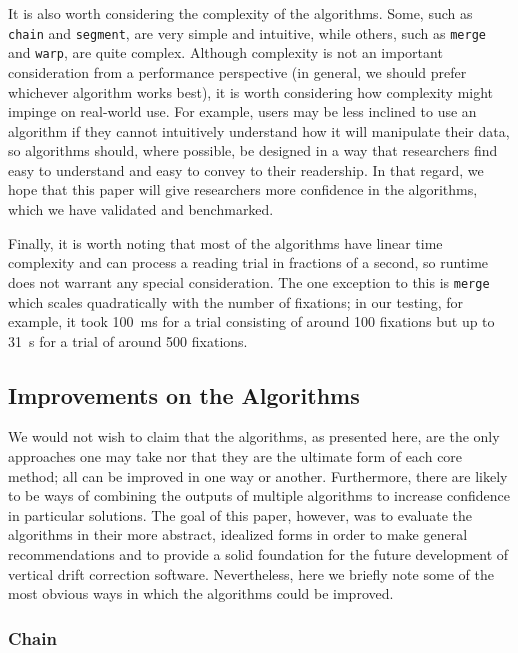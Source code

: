 \documentclass[doc,biblatex]{apa7}
\begin{document}
It is also worth considering the complexity of the algorithms. Some, such as \texttt{chain} and \texttt{segment}, are very simple and intuitive, while others, such as \texttt{merge} and \texttt{warp}, are quite complex. Although complexity is not an important consideration from a performance perspective (in general, we should prefer whichever algorithm works best), it is worth considering how complexity might impinge on real-world use. For example, users may be less inclined to use an algorithm if they cannot intuitively understand how it will manipulate their data, so algorithms should, where possible, be designed in a way that researchers find easy to understand and easy to convey to their readership. In that regard, we hope that this paper will give researchers more confidence in the algorithms, which we have validated and benchmarked.

Finally, it is worth noting that most of the algorithms have linear time complexity and can process a reading trial in fractions of a second, so runtime does not warrant any special consideration. The one exception to this is \texttt{merge} which scales quadratically with the number of fixations; in our testing, for example, it took 100~ms for a trial consisting of around 100 fixations but up to 31~s for a trial of around 500 fixations.

\subsection{Improvements on the Algorithms}

We would not wish to claim that the algorithms, as presented here, are the only approaches one may take nor that they are the ultimate form of each core method; all can be improved in one way or another. Furthermore, there are likely to be ways of combining the outputs of multiple algorithms to increase confidence in particular solutions. The goal of this paper, however, was to evaluate the algorithms in their more abstract, idealized forms in order to make general recommendations and to provide a solid foundation for the future development of vertical drift correction software. Nevertheless, here we briefly note some of the most obvious ways in which the algorithms could be improved.

\subsubsection{Chain}
\end{document}
